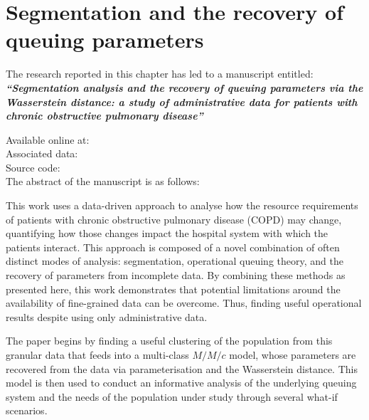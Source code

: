 \chapter{Segmentation and the recovery of queuing parameters}
\label{chp:copd}

\graphicspath{{chapters/copd/paper/img/}}
\renewcommand{\texpath}{chapters/copd/paper/tex}

\begin{center}
    The research reported in this chapter has led to a manuscript
    entitled:\\[1em]

    {%
        \bf\itshape{``Segmentation analysis and the recovery of queuing
                    parameters via the Wasserstein distance: a study of
                    administrative data for patients with chronic obstructive
                    pulmonary disease''}
    }

    Available online at: \\
    Associated data: \\
    Source code: \\[2em]

    The abstract of the manuscript is as follows:\\[1em]
\end{center}

This work uses a data-driven approach to analyse how the resource requirements
of patients with chronic obstructive pulmonary disease (COPD) may change,
quantifying how those changes impact the hospital system with which the patients
interact. This approach is composed of a novel combination of often distinct
modes of analysis: segmentation, operational queuing theory, and the recovery of
parameters from incomplete data. By combining these methods as presented here,
this work demonstrates that potential limitations around the availability of
fine-grained data can be overcome. Thus, finding useful operational results
despite using only administrative data.

The paper begins by finding a useful clustering of the population from this
granular data that feeds into a multi-class \(M/M/c\) model, whose parameters
are recovered from the data via parameterisation and the Wasserstein distance.
This model is then used to conduct an informative analysis of the underlying
queuing system and the needs of the population under study through several
what-if scenarios.

